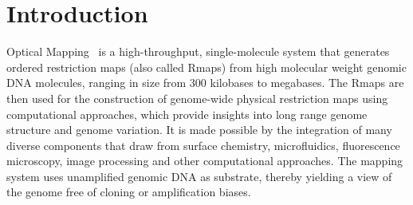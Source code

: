 \documentclass{bmcart}
\begin{document}
\begin{frontmatter}
\begin{abstractbox}
\begin{keyword}
\end{keyword}


\end{abstractbox}
%

\end{frontmatter}



\section*{Introduction}
Optical Mapping~\cite{Schwartz1993, Dimalanta2004, Teague2010} is a 
high-throughput, single-molecule system that generates ordered restriction 
maps (also called Rmaps) from high molecular weight genomic 
DNA molecules, ranging in size from 300 kilobases to megabases. The Rmaps are 
then used for the construction of genome-wide physical restriction maps using computational approaches, which provide insights into long range genome 
structure and genome variation. It is made possible by the integration of many 
diverse components that draw from surface chemistry, microfluidics, fluorescence microscopy, image processing and other computational approaches. The mapping 
system uses unamplified genomic DNA as substrate, thereby yielding a view of the genome free of cloning or amplification biases.
\end{document}
